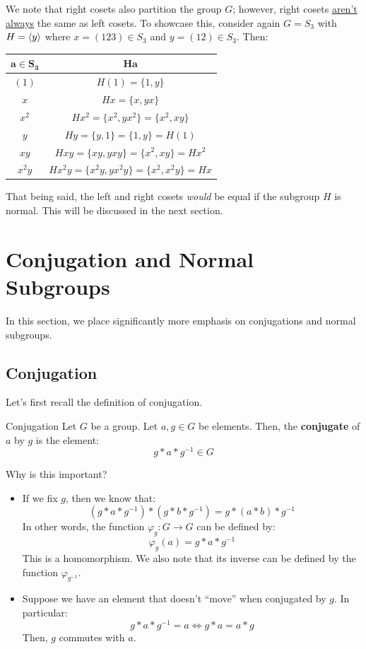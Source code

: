 \documentclass[letterpaper]{article}
\begin{document}
We note that right cosets also partition the group $G$; however, right cosets \underline{aren't always} the same as left cosets. To showcase this, consider again $G = S_3$ with $H = \langle y \rangle$ where $x = (123) \in S_3$ and $y = (12) \in S_3$. Then:
\begin{center}
    \begin{tabular}{c|c}
        $\mathbf{a \in S_3}$ & $\mathbf{Ha}$ \\ 
        \hline 
        $(1)$       & $H(1) = \{1, y\}$ \\ 
        $x$         & $Hx = \{x, yx\}$ \\ 
        $x^2$       & $Hx^2 = \{x^2, yx^2\} = \{x^2, xy\}$ \\ 
        $y$         & $Hy = \{y, 1\} = \{1, y\} = H(1)$ \\ 
        $xy$        & $Hxy = \{xy, yxy\} = \{x^2, xy\} = Hx^2$ \\ 
        $x^2 y$     & $Hx^2 y = \{x^2 y, yx^2 y\} = \{x^2, x^2 y\} = Hx$
    \end{tabular}
\end{center}
That being said, the left and right cosets \emph{would} be equal if the subgroup $H$ is normal. This will be discussed in the next section.












\newpage 
\section{Conjugation and Normal Subgroups}
In this section, we place significantly more emphasis on conjugations and normal subgroups. 

\subsection{Conjugation}
Let's first recall the definition of conjugation.
\begin{definition}{Conjugation}{}
    Let $G$ be a group. Let $a, g \in G$ be elements. Then, the \textbf{conjugate} of $a$ by $g$ is the element: 
    \[g * a * g^{-1} \in G\]
\end{definition}
Why is this important? 
\begin{itemize}
    \item If we fix $g$, then we know that: 
    \[(g * a * g^{-1}) * (g * b * g^{-1}) = g * (a * b) * g^{-1}\]
    In other words, the function $\varphi_g: G \to G$ can be defined by: 
    \[\varphi_{g}(a) = g * a * g^{-1}\]
    This is a homomorphism. We also note that its inverse can be defined by the function $\varphi_{g^{-1}}$.
    
    \item Suppose we have an element that doesn't ``move'' when conjugated by $g$. In particular: 
    \[g * a * g^{-1} = a \iff g * a = a * g\]
    Then, $g$ commutes with $a$. 
\end{itemize}
\end{document}
